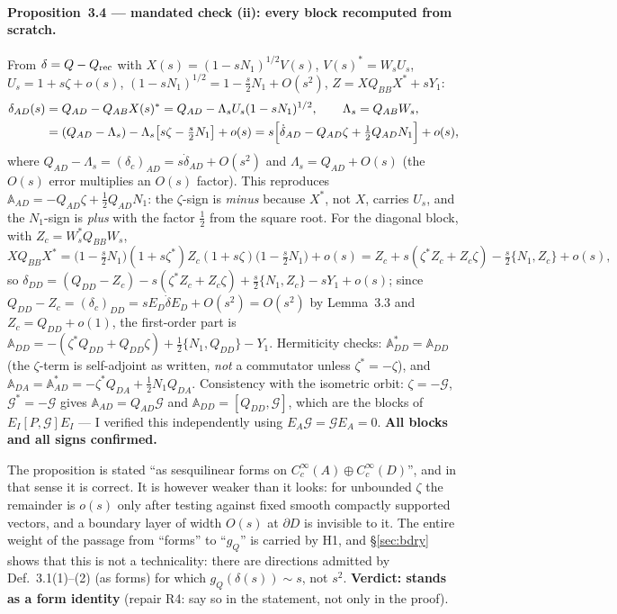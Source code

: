 \documentclass[11pt]{article}
\newcommand{\Aop}{\mathbb A}
\begin{document}
\paragraph{Proposition~3.4 --- mandated check (ii): every block recomputed from scratch.}
From $\delta=Q-Q_{\rm rec}$ with $X(s)=(1-sN_1)^{1/2}V(s)$, $V(s)^*=W_sU_s$,
$U_s=1+s\zeta+o(s)$, $(1-sN_1)^{1/2}=1-\frac s2N_1+O(s^2)$, $Z=XQ_{BB}X^*+sY_1$:
\begin{align*}
 \delta_{AD}(s)&=Q_{AD}-Q_{AB}X(s)^*=Q_{AD}-\Lambda_sU_s(1-sN_1)^{1/2},\qquad \Lambda_s=Q_{AB}W_s,\\
 &=(Q_{AD}-\Lambda_s)-\Lambda_s\bigl[s\zeta-\tfrac s2N_1\bigr]+o(s)
  =s\Bigl[\dot\delta_{AD}-Q_{AD}\zeta+\tfrac12Q_{AD}N_1\Bigr]+o(s),
\end{align*}
where $Q_{AD}-\Lambda_s=(\delta_c)_{AD}=s\dot\delta_{AD}+O(s^2)$ and $\Lambda_s=Q_{AD}+O(s)$
(the $O(s)$ error multiplies an $O(s)$ factor).  This reproduces
$\Aop_{AD}=-Q_{AD}\zeta+\frac12Q_{AD}N_1$: the $\zeta$-sign is \emph{minus} because
$X^*$, not $X$, carries $U_s$, and the $N_1$-sign is \emph{plus} with the factor $\frac12$
from the square root.  For the diagonal block, with $Z_c=W_s^*Q_{BB}W_s$,
\[ X Q_{BB}X^*=\bigl(1-\tfrac s2N_1\bigr)(1+s\zeta^*)Z_c(1+s\zeta)\bigl(1-\tfrac s2N_1\bigr)+o(s)
 =Z_c+s(\zeta^*Z_c+Z_c\zeta)-\tfrac s2\{N_1,Z_c\}+o(s), \]
so $\delta_{DD}=(Q_{DD}-Z_c)-s(\zeta^*Z_c+Z_c\zeta)+\frac s2\{N_1,Z_c\}-sY_1+o(s)$; since
$Q_{DD}-Z_c=(\delta_c)_{DD}=sE_D\dot\delta E_D+O(s^2)=O(s^2)$ by Lemma~3.3 and
$Z_c=Q_{DD}+o(1)$, the first-order part is
$\Aop_{DD}=-(\zeta^*Q_{DD}+Q_{DD}\zeta)+\frac12\{N_1,Q_{DD}\}-Y_1$.  Hermiticity checks:
$\Aop_{DD}^*=\Aop_{DD}$ (the $\zeta$-term is self-adjoint as written, \emph{not} a
commutator unless $\zeta^*=-\zeta$), and
$\Aop_{DA}=\Aop_{AD}^*=-\zeta^*Q_{DA}+\frac12N_1Q_{DA}$.  Consistency with the isometric
orbit: $\zeta=-\mathcal G$, $\mathcal G^*=-\mathcal G$ gives
$\Aop_{AD}=Q_{AD}\mathcal G$ and $\Aop_{DD}=[Q_{DD},\mathcal G]$, which are the blocks of
$E_I[P,\mathcal G]E_I$ --- I verified this independently using $E_A\mathcal G=\mathcal GE_A=0$.
\textbf{All blocks and all signs confirmed.}
\begin{verdictgap}
The proposition is stated ``as sesquilinear forms on $C_c^\infty(A)\oplus C_c^\infty(D)$'',
and in that sense it is correct.  It is however weaker than it looks: for unbounded $\zeta$
the remainder is $o(s)$ only after testing against fixed smooth compactly supported
vectors, and a boundary layer of width $O(s)$ at $\partial D$ is invisible to it.  The
entire weight of the passage from ``forms'' to ``$g_Q$'' is carried by H1, and
\S\ref{sec:bdry} shows that this is not a technicality: there are directions admitted by
Def.~3.1(1)--(2) (as forms) for which $g_Q(\delta(s))\sim s$, not $s^2$.  \textbf{Verdict:
stands as a form identity} (repair R4: say so in the statement, not only in the proof).
\end{verdictgap}
\end{document}
